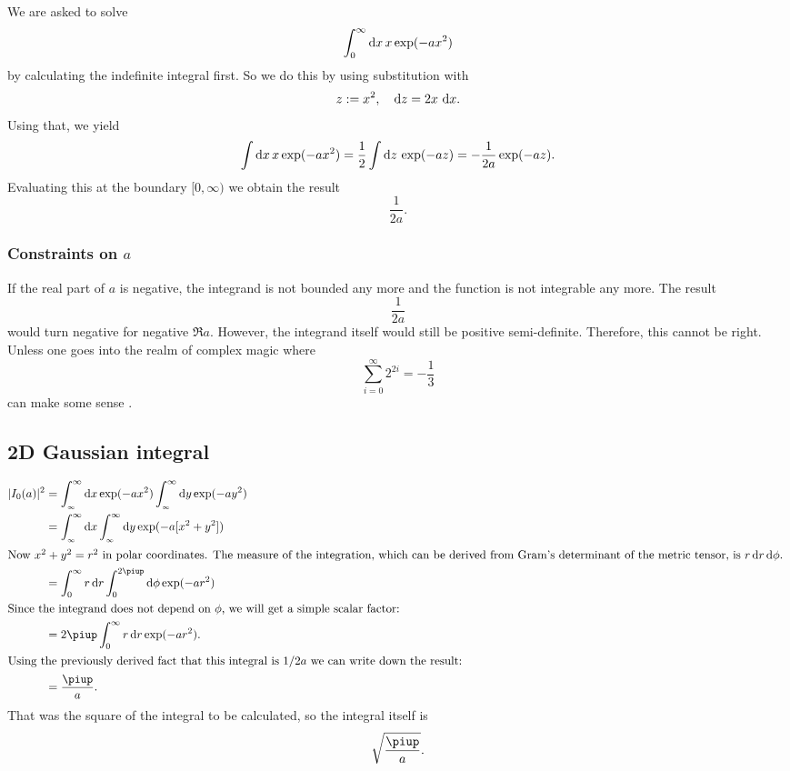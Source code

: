 \documentclass[11pt, english, fleqn, DIV=15, headinclude, BCOR=1cm]{scrartcl}
\begin{document}
We are asked to solve
\[
    \int_0^\infty \mathop{}\!\mathrm d x \, x \exp(-ax^2)
\]
by calculating the indefinite integral first. So we do this by using
substitution with
\[
    z := x^2
    ,\quad
    \mathop{}\!\mathrm d z = 2 x \, \mathop{}\!\mathrm d x.
\]
Using that, we yield
\[
    \int \mathop{}\!\mathrm d x \, x \exp(-ax^2) = \frac{1}{2} \int \mathop{}\!\mathrm d z \, \exp(-az) = -
    \frac{1}{2a} \exp(-az).
\]
Evaluating this at the boundary $[0, \infty)$ we obtain the result
\[
    \frac{1}{2a}.
\]

\subsubsection{Constraints on $a$}

If the real part of $a$ is negative, the integrand is not bounded any more and
the function is not integrable any more. The result
\[
    \frac{1}{2a}
\]
would turn negative for negative $\Re a$. However, the integrand itself would
still be positive semi-definite. Therefore, this cannot be right. Unless one
goes into the realm of complex magic where
\[
    \sum_{i = 0}^\infty 2^{2i} = - \frac{1}{3}
\]
can make some sense \parencite[78]{penrose-road_to_reality}.

\subsection{2D Gaussian integral}

\begin{align*}
    |I_0(a)|^2
    &=
    \int_{_\infty}^\infty \dif x \exp(-ax^2)
    \int_{_\infty}^\infty \dif y \exp(-ay^2) \\
    &=
    \int_{_\infty}^\infty \dif x \int_{_\infty}^\infty \dif y \exp(-a[x^2+y^2]) \\
    \intertext{%
        Now $x^2 + y^2 = r^2$ in polar coordinates. The measure of the
        integration, which can be derived from Gram's determinant of the
        metric tensor, is $r \dif r \dif \phi$.
    }
    &= \int_0^\infty r \dif r \int_0^{2\piup} \dif \phi \exp(-ar^2) \\
    \intertext{%
        Since the integrand does not depend on $\phi$, we will get a simple
        scalar factor:
    }
    &= 2 \piup \int_0^\infty r \dif r \exp(-ar^2). \\
    \intertext{%
        Using the previously derived fact that this integral is $1/2a$ we can
        write down the result:
    }
    &= \frac{\piup}a.
\end{align*}
That was the square of the integral to be calculated, so the integral itself is
\[
    \sqrt{\frac\piup a}.
\]
\end{document}
